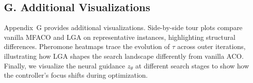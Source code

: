 \documentclass[sigconf,anonymous,review]{acmart}
\theoremstyle{definition}
\theoremstyle{plain}
\begin{document}
\subsection{G. Additional Visualizations}

Appendix~G provides additional visualizations.
Side-by-side tour plots compare vanilla MFACO and LGA on representative instances, highlighting structural differences.
Pheromone heatmaps trace the evolution of $\tau$ across outer iterations, illustrating how LGA shapes the search landscape differently from vanilla ACO.
Finally, we visualize the neural guidance $z_\theta$ at different search stages to show how the controller's focus shifts during optimization.
\end{document}
